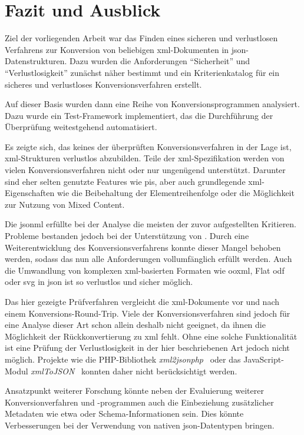 \chapter{Fazit und Ausblick} \label{chap:conclusion}
Ziel der vorliegenden Arbeit war das Finden eines sicheren und verlustlosen Verfahrens zur Konversion von beliebigen \acrshort{xml}-Dokumenten in \acrshort{json}-Datenstrukturen. Dazu wurden die Anforderungen \enquote{Sicherheit} und \enquote{Verlustlosigkeit} zunächst näher bestimmt und ein Kriterienkatalog für ein sicheres und verlustloses Konversionsverfahren erstellt.

Auf dieser Basis wurden dann eine Reihe von Konversionsprogrammen analysiert. Dazu wurde ein Test-Framework implementiert, das die Durchführung der Überprüfung weitestgehend automatisiert.

Es zeigte sich, das keines der überprüften Konversionsverfahren in der Lage ist, \acrshort{xml}-Strukturen verlustlos abzubilden. Teile der \acrshort{xml}-Spezifikation werden von vielen Konversionsverfahren nicht oder nur ungenügend unterstützt. Darunter sind eher selten genutzte Features wie \glspl{pi}, aber auch grundlegende \acrshort{xml}-Eigenschaften wie die Beibehaltung der Elementreihenfolge oder die Möglichkeit zur Nutzung von Mixed Content.

Die \acrfull{jsonml} erfüllte bei der Analyse die meisten der zuvor aufgestellten Kritieren. Probleme bestanden jedoch bei der Unterstützung von . Durch eine Weiterentwicklung des Konversionsverfahrens konnte dieser Mangel behoben werden, sodass das nun alle Anforderungen vollumfänglich erfüllt werden. Auch die Umwandlung von komplexen \acrshort{xml}-basierten Formaten wie \gls{ooxml}, Flat \gls{odf} oder \gls{svg} in \acrshort{json} ist so verlustlos und sicher möglich.

Das hier gezeigte Prüfverfahren vergleicht die \acrshort{xml}-Dokumente vor und nach einem Konversions-Round-Trip. Viele der Konversionsverfahren sind jedoch für eine Analyse dieser Art schon allein deshalb nicht geeignet, da ihnen die Möglichkeit der Rückkonvertierung zu \acrshort{xml} fehlt. Ohne eine solche Funktionalität ist eine Prüfung der Verlustlosigkeit in der hier beschriebenen Art jedoch nicht möglich. Projekte wie die PHP-Bibliothek \emph{xml2jsonphp}~\cite{xml2jsonphp} oder das JavaScript-Modul \emph{xmlToJSON}~\cite{metatribalxmltojson} konnten daher nicht berücksichtigt werden.

Ansatzpunkt weiterer Forschung könnte neben der Evaluierung weiterer Konversionverfahren und -programmen auch die Einbeziehung zusätzlicher Metadaten wie etwa  oder Schema-Informationen sein. Dies könnte Verbesserungen bei der Verwendung von nativen \acrshort{json}-Datentypen bringen.


